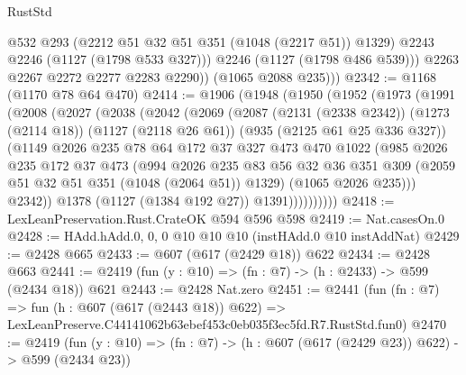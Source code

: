 \begin{lexlean}{RustStd}
\begin{coremodule}
                @532
                @293
                (@2212 @51 @32 @51 @351 (@1048 (@2217 @51)) @1329)
                @2243
                @2246
                (@1127 (@1798 @533 @327)))
              @2246
              (@1127 (@1798 @486 @539)))
            @2263
            @2267
            @2272
            @2277
            @2283
            @2290))
        (@1065 @2088 @235)))
@2342 := @1168 (@1170 @78 @64 @470)
@2414 := @1906
    (@1948
      (@1950
        (@1952
          (@1973
            (@1991
              (@2008
                (@2027
                  (@2038
                    (@2042
                      (@2069
                        (@2087
                          (@2131 (@2338 @2342))
                          (@1273 (@2114 @18))
                          (@1127 (@2118 @26 @61))
                          (@935 (@2125 @61 @25 @336 @327))
                          (@1149
                            @2026
                            @235
                            @78
                            @64
                            @172
                            @37
                            @327
                            @473
                            @470
                            @1022
                            (@985
                              @2026
                              @235
                              @172
                              @37
                              @473
                              (@994
                                @2026
                                @235
                                @83
                                @56
                                @32
                                @36
                                @351
                                @309
                                (@2059 @51 @32 @51 @351 (@1048 (@2064 @51)) @1329)
                                (@1065 @2026 @235)))
                            @2342))
                        @1378
                        (@1127 (@1384 @192 @27))
                        @1391))))))))))
@2418 := LexLeanPreservation.Rust.CrateOK @594 @596 @598
@2419 := Nat.casesOn.{0}
@2428 := HAdd.hAdd.{0, 0, 0} @10 @10 @10 (instHAdd.{0} @10 instAddNat)
@2429 := @2428 @665
@2433 := @607 (@617 (@2429 @18)) @622
@2434 := @2428 @663
@2441 := @2419 (fun (y : @10) => (fn : @7) -> (h : @2433) -> @599 (@2434 @18)) @621
@2443 := @2428 Nat.zero
@2451 := @2441
    (fun (fn : @7) =>
    fun (h : @607 (@617 (@2443 @18)) @622) =>
    LexLeanPreserve.C44141062b63ebef453c0eb035f3ec5fd.R7.RustStd.fun0)
@2470 := @2419
    (fun (y : @10) => (fn : @7) -> (h : @607 (@617 (@2429 @23)) @622) -> @599 (@2434 @23))

\end{coremodule}
\end{lexlean}
